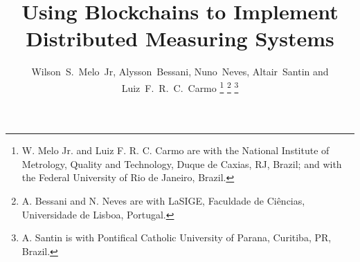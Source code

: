 \documentclass[journal]{IEEEtran}
\begin{document}

\title{Using Blockchains to Implement Distributed Measuring Systems}

\author{
\and
{}
\and
{}
}

\author{Wilson~S.~Melo~Jr, %
        Alysson~Bessani, %
        Nuno~Neves, %
        Altair~Santin
        and Luiz~F.~R.~C.~Carmo
\thanks{W. Melo Jr. and Luiz F. R. C. Carmo are with the National Institute of Metrology, Quality and Technology, Duque de Caxias, RJ, Brazil; and with the Federal University of Rio de Janeiro, Brazil.}%
\thanks{A. Bessani and N. Neves are with LaSIGE, Faculdade de Ci\^encias, Universidade de Lisboa, Portugal.}%
\thanks{A. Santin is with Pontifical Catholic University of Parana, Curitiba, PR, Brazil.}%
}
\end{document}
